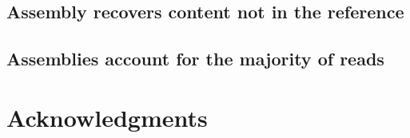 \subsection*{Assembly recovers content not in the reference } 


\subsection*{Assemblies account for the majority of reads}
  

\section*{Acknowledgments}



%
%
% 





